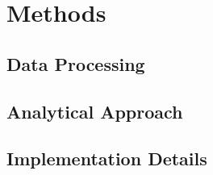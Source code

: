 \section{Methods}
\label{sec:methods}


\subsection{Data Processing}

\subsection{Analytical Approach}

\subsection{Implementation Details}
